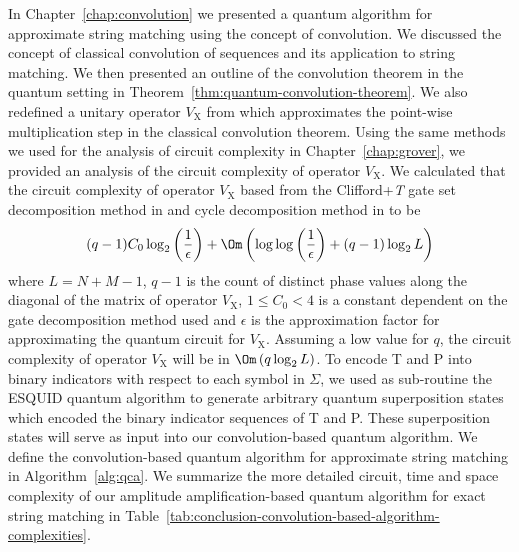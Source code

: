 In Chapter~\ref{chap:convolution} we presented a quantum algorithm for approximate string matching using the concept of convolution. We discussed the concept of classical convolution of sequences and its application to string matching. We then presented an outline of the convolution theorem in the quantum setting in Theorem~\ref{thm:quantum-convolution-theorem}. We also redefined a unitary operator $V_{\mathrm{X}}$ from \cite{Curtis2004} which approximates the point-wise multiplication step in the classical convolution theorem. Using the same methods \cite{Bocharov2015} we used for the analysis of circuit complexity in Chapter~\ref{chap:grover}, we provided an analysis of the circuit complexity of operator $V_{\mathrm{X}}$. We calculated that the circuit complexity of operator $V_{\mathrm{X}}$ based from the Clifford+\textit{T} gate set decomposition method in \cite{Bocharov2015} and cycle decomposition method in \cite{Welch2015} to be
\[
	(q-1)C_0\log_2 \left( \frac{1}{\epsilon} \right) + \Om\left( \log\log \left(\frac{1}{\epsilon}\right) + (q-1)\log_2 L \right)
\]
where $L=N+M-1$, $q-1$ is the count of distinct phase values along the diagonal of the matrix of operator $V_{\mathrm{X}}$, $1 \leq C_0 < 4$ is a constant dependent on the gate decomposition method used and $\epsilon$ is the approximation factor for approximating the quantum circuit for $V_{\mathrm{X}}$. Assuming a low value for $q$, the circuit complexity of operator $V_{\mathrm{X}}$ will be in $\Om\left( q\log_2 L \right)$. To encode T and P into binary indicators with respect to each symbol in $\Sigma$, we used as sub-routine the ESQUID quantum algorithm \cite{Rosenbaum2009} to generate arbitrary quantum superposition states which encoded the binary indicator sequences of T and P. These superposition states will serve as input into our convolution-based quantum algorithm. We define the convolution-based quantum algorithm for approximate string matching in Algorithm~\ref{alg:qca}.
We summarize the more detailed circuit, time and space complexity of our amplitude amplification-based quantum algorithm for exact string matching in Table~\ref{tab:conclusion-convolution-based-algorithm-complexities}.
